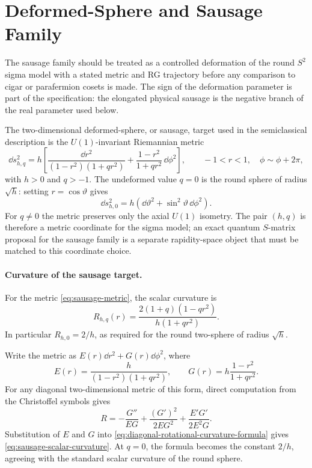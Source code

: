 \section{Deformed-Sphere and Sausage Family}
\label{sec:deformed-sphere-sausage-family}

The sausage family should be treated as a controlled deformation of the round
\(S^2\) sigma model with a stated metric and RG trajectory before any
comparison to cigar or parafermion cosets is made.  The sign of the
deformation parameter is part of the specification: the elongated physical
sausage is the negative branch of the real parameter used below.

\begin{definition}
\label{def:sausage-metric-specification}
The two-dimensional deformed-sphere, or sausage, target used in the
semiclassical description is the \(U(1)\)-invariant Riemannian metric
\begin{equation}
  \dd s^2_{h,q}
  =
  h\left[
    \frac{\dd r^2}{(1-r^2)(1+q r^2)}
    +
    \frac{1-r^2}{1+q r^2}\,\dd\phi^2
  \right],
  \qquad
  -1<r<1,\quad \phi\sim\phi+2\pi ,
  \label{eq:sausage-metric}
\end{equation}
with \(h>0\) and \(q>-1\).  The undeformed value
\(q=0\) is the round sphere of radius \(\sqrt h\): setting
\(r=\cos\vartheta\) gives
\[
  \dd s^2_{h,0}=h(\dd\vartheta^2+\sin^2\vartheta\,\dd\phi^2).
\]
For \(q\ne0\) the metric preserves only the axial \(U(1)\) isometry.  The
pair \((h,q)\) is therefore a metric coordinate for the sigma model; an exact
quantum \(S\)-matrix proposal for the sausage family is a separate
rapidity-space object that must be matched to this coordinate choice.
\end{definition}

\paragraph{Curvature of the sausage target.}
For the metric \eqref{eq:sausage-metric}, the scalar curvature is
\begin{equation}
  R_{h,q}(r)
  =
  \frac{2(1+q)(1-q r^2)}
       {h(1+q r^2)} .
  \label{eq:sausage-scalar-curvature}
\end{equation}
In particular \(R_{h,0}=2/h\), as required for the round two-sphere of radius
\(\sqrt h\).

Write the metric as \(E(r)\dd r^2+G(r)\dd\phi^2\), where
\[
  E(r)=\frac{h}{(1-r^2)(1+qr^2)},
  \qquad
  G(r)=h\frac{1-r^2}{1+qr^2}.
\]
For any diagonal two-dimensional metric of this form, direct computation from
the Christoffel symbols gives
\begin{equation}
  R
  =
  -\frac{G''}{EG}
  +\frac{(G')^2}{2EG^2}
  +\frac{E'G'}{2E^2G}.
  \label{eq:diagonal-rotational-curvature-formula}
\end{equation}
Substitution of \(E\) and \(G\) into
\eqref{eq:diagonal-rotational-curvature-formula} gives
\eqref{eq:sausage-scalar-curvature}.  At \(q=0\), the formula becomes the
constant \(2/h\), agreeing with the standard scalar curvature of the round
sphere.

